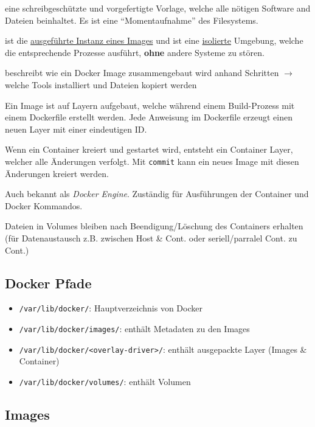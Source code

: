\documentclass[
  10pt,
  a4paper,
]{article}
\providecommand{\tightlist}{%
  \setlength{\itemsep}{0pt}\setlength{\parskip}{0pt}}\usepackage{longtable,booktabs,array}
\begin{document}
\begin{multicols*}{2}
\begin{description}
\tightlist
\item[Image]
eine schreibgeschützte und vorgefertigte Vorlage, welche alle nötigen
Software and Dateien beinhaltet. Es ist eine ``Momentaufnahme'' des
Filesystems.
\item[Container]
ist die \ul{ausgeführte Instanz eines Images} und ist eine
\ul{isolierte} Umgebung, welche die entsprechende Prozesse ausführt,
\textbf{ohne} andere Systeme zu stören.
\item[Dockerfile]
beschreibt wie ein Docker Image zusammengebaut wird anhand Schritten
\(\rightarrow\) welche Tools installiert und Dateien kopiert werden
\item[Layers]
Ein Image ist auf Layern aufgebaut, welche während einem Build-Prozess
mit einem Dockerfile erstellt werden. Jede Anweisung im Dockerfile
erzeugt einen neuen Layer mit einer eindeutigen ID.
\item[Container Layer]
Wenn ein Container kreiert und gestartet wird, entsteht ein Container
Layer, welcher alle Änderungen verfolgt. Mit \texttt{commit} kann ein
neues Image mit diesen Änderungen kreiert werden.
\item[Docker daemon \texttt{dockerd} (Service)]
Auch bekannt als \emph{Docker Engine}. Zuständig für Ausführungen der
Container und Docker Kommandos.
\item[Volumes]
Dateien in Volumes bleiben nach Beendigung/Löschung des Containers
erhalten (für Datenaustausch z.B. zwischen Host \& Cont. oder
seriell/parralel Cont. zu Cont.)
\end{description}

\subsection{Docker Pfade}\label{docker-pfade}

\begin{itemize}
\tightlist
\item
  \texttt{/var/lib/docker/}: Hauptverzeichnis von Docker
\item
  \texttt{/var/lib/docker/images/}: enthält Metadaten zu den Images
\item
  \texttt{/var/lib/docker/\textless{}overlay-driver\textgreater{}/}:
  enthält ausgepackte Layer (Images \& Container)
\item
  \texttt{/var/lib/docker/volumes/}: enthält Volumen
\end{itemize}

\subsection{Images}\label{images}


\end{multicols*}
\end{document}

